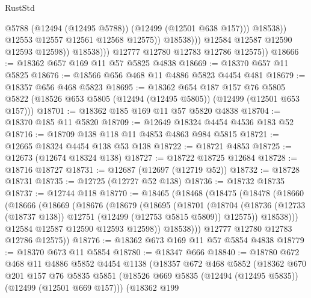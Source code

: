 \begin{lexlean}{RustStd}
\begin{coremodule}
{\begin{coremodule}
{{{{{{{{{{{{{{{{{{{{{{{{{{{{{{{{{{{{{{{{{{{{{{{{{{{{{{{{{{{{{{{{{{{{{{{{{{{{{{{{                                  @5788
                                  (@12494 (@12495 @5788))
                                  (@12499 (@12501 @638 @157)))
                                @18538))
                            @12553
                            @12557
                            @12561
                            @12568
                            @12575))
                        @18538)))
                  @12584
                  @12587
                  @12590
                  @12593
                  @12598))
              @18538)))
        @12777
        @12780
        @12783
        @12786
        @12575))
@18666 := @18362 @657 @169 @11 @57 @5825 @4838
@18669 := @18370 @657 @11 @5825
@18676 := @18566 @656 @468 @11 @4886 @5823 @4454 @481
@18679 := @18357 @656 @468 @5823
@18695 := @18362
    @654
    @187
    @157
    @76
    @5805
    @5822
    (@18526 @653 @5805 (@12494 (@12495 @5805)) (@12499 (@12501 @653 @157)))
@18701 := @18362 @185 @169 @11 @57 @5820 @4838
@18704 := @18370 @185 @11 @5820
@18709 := @12649 @18324 @4454 @4536 @183 @52
@18716 := @18709 @138 @118 @11 @4853 @4863 @984 @5815
@18721 := @12665 @18324 @4454 @138 @53 @138
@18722 := @18721 @4853
@18725 := @12673 (@12674 @18324 @138)
@18727 := @18722 @18725 @12684
@18728 := @18716 @18727
@18731 := @12687 (@12697 (@12719 @52))
@18732 := @18728 @18731
@18735 := @12725 (@12727 @52 @138)
@18736 := @18732 @18735
@18737 := @12744 @118
@18770 := @18465
    (@18468
      (@18475
        (@18478
          (@18660
            (@18666
              (@18669
                (@18676
                  (@18679
                    (@18695
                      (@18701
                        (@18704
                          (@18736
                            (@12733 (@18737 @138))
                            @12751
                            (@12499 (@12753 @5815 @5809))
                            @12575))
                        @18538)))
                  @12584
                  @12587
                  @12590
                  @12593
                  @12598))
              @18538)))
        @12777
        @12780
        @12783
        @12786
        @12575))
@18776 := @18362 @673 @169 @11 @57 @5854 @4838
@18779 := @18370 @673 @11 @5854
@18780 := @18347 @666
@18840 := @18780
    @672
    @468
    @11
    @4886
    @5852
    @4454
    @1138
    (@18357
      @672
      @468
      @5852
      (@18362
        @670
        @201
        @157
        @76
        @5835
        @5851
        (@18526 @669 @5835 (@12494 (@12495 @5835)) (@12499 (@12501 @669 @157)))
        (@18362
          @199
}}}}}}}}}}}}}}}}}}}}}}}}}}}}}}}}}}}}}}}}}}}}}}}}}}}}}}}}}}}}}}}}}}}}}}}}}}}}}}}}
\end{coremodule}}
\end{coremodule}
\end{lexlean}
